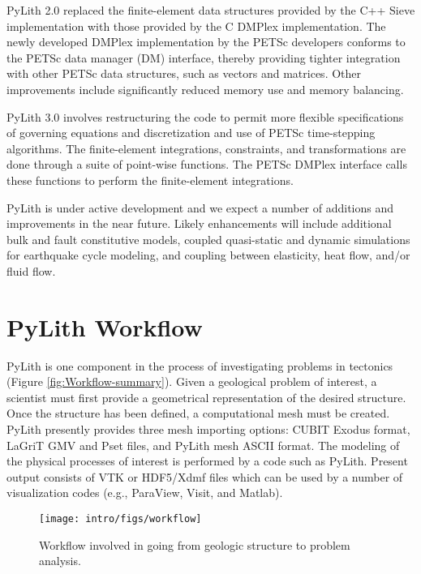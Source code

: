 PyLith 2.0 replaced the finite-element data structures provided by the
C++ Sieve implementation with those provided by the C DMPlex
implementation.  The newly developed DMPlex implementation by the
PETSc developers conforms to the PETSc data manager (DM) interface,
thereby providing tighter integration with other PETSc data
structures, such as vectors and matrices. Other improvements include
significantly reduced memory use and memory balancing.

PyLith 3.0 involves restructuring the code to permit more flexible
specifications of governing equations and discretization and use of
PETSc time-stepping algorithms. The finite-element integrations,
constraints, and transformations are done through a suite of
point-wise functions. The PETSc DMPlex interface calls these functions
to perform the finite-element integrations. 

PyLith is under active development and we expect a number of additions
and improvements in the near future. Likely enhancements will include
additional bulk and fault constitutive models, coupled quasi-static
and dynamic simulations for earthquake cycle modeling, and coupling
between elasticity, heat flow, and/or fluid flow.


\section{PyLith Workflow}

PyLith is one component in the process of investigating problems in
tectonics (Figure \vref{fig:Workflow-summary}). Given a geological
problem of interest, a scientist must first provide a geometrical
representation of the desired structure. Once the structure has been
defined, a computational mesh must be created. PyLith presently
provides three mesh importing options: CUBIT Exodus format, LaGriT GMV
and Pset files, and PyLith mesh ASCII format. The modeling of the
physical processes of interest is performed by a code such as
PyLith. Present output consists of VTK or HDF5/Xdmf files which can be
used by a number of visualization codes (e.g., ParaView, Visit, and
Matlab).

\begin{figure}[htbp]
  \texttt{[image: intro/figs/workflow]}
  \caption{Workflow involved in going from geologic structure to
    problem analysis.}
  \label{fig:Workflow-summary}
\end{figure}

